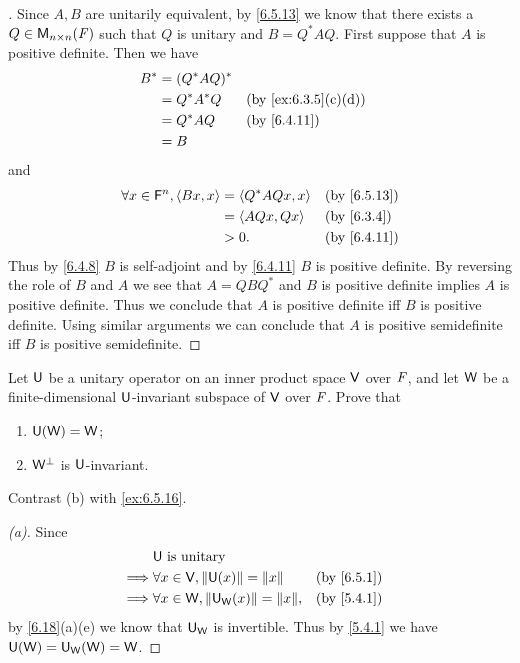 \begin{proof}[]
  Since \(A, B\) are unitarily equivalent, by \cref{6.5.13} we know that there exists a \(Q \in \ms[n][n][\F]\) such that \(Q\) is unitary and \(B = Q^* A Q\).
  First suppose that \(A\) is positive definite.
  Then we have
  \begin{align*}
    B^* & = (Q^* A Q)^*                         \\
        & = Q^* A^* Q   &  & \by{ex:6.3.5}[c,d] \\
        & = Q^* A Q     &  & \by{6.4.11}        \\
        & = B
  \end{align*}
  and
  \begin{align*}
    \forall x \in \vs{F}^n, \inn{Bx, x} & = \inn{Q^* A Q x, x} &  & \by{6.5.13} \\
                                        & = \inn{AQx, Qx}      &  & \by{6.3.4}  \\
                                        & > 0.                 &  & \by{6.4.11}
  \end{align*}
  Thus by \cref{6.4.8} \(B\) is self-adjoint and by \cref{6.4.11} \(B\) is positive definite.
  By reversing the role of \(B\) and \(A\) we see that \(A = Q B Q^*\) and \(B\) is positive definite implies \(A\) is positive definite.
  Thus we conclude that \(A\) is positive definite iff \(B\) is positive definite.
  Using similar arguments we can conclude that \(A\) is positive semidefinite iff \(B\) is positive semidefinite.
\end{proof}

\begin{ex}\label{ex:6.5.15}
  Let \(\mathsf{U}\) be a unitary operator on an inner product space \(\mathsf{V}\) over \(\mathit{F}\), and let \(\mathsf{W}\) be a finite-dimensional \(\mathsf{U}\)-invariant subspace of \(\mathsf{V}\) over \(\mathit{F}\).
  Prove that
  \begin{enumerate}
    \item \(\mathsf{U}(\mathsf{W}) = \mathsf{W}\);
    \item \(\mathsf{W}^{\perp}\) is \(\mathsf{U}\)-invariant.
  \end{enumerate}
  Contrast (b) with \cref{ex:6.5.16}.
\end{ex}

\begin{proof}[(a)]
  Since
  \begin{align*}
             & \U \text{ is unitary}                                           \\
    \implies & \forall x \in \V, \norm{\U(x)} = \norm{x}       &  & \by{6.5.1} \\
    \implies & \forall x \in \W, \norm{\U_{\W}(x)} = \norm{x}, &  & \by{5.4.1}
  \end{align*}
  by \cref{6.18}(a)(e) we know that \(\mathsf{U}_{\mathsf{W}}\) is invertible.
  Thus by \cref{5.4.1} we have \(\mathsf{U}(\mathsf{W}) = \mathsf{U}_{\mathsf{W}}(\mathsf{W}) = \mathsf{W}\).
\end{proof}


